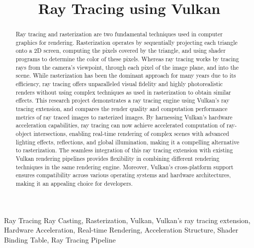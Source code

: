\documentclass[conference]{IEEEtran}
\begin{document}
\title{Ray Tracing using Vulkan}

\author{
}

\maketitle

\begin{abstract}
    Ray tracing and rasterization are two fundamental techniques used in computer graphics for rendering. Rasterization operates by sequentially projecting each triangle onto a 2D screen, computing the pixels covered by the triangle, and using shader programs to determine the color of these pixels. Whereas ray tracing works by tracing rays from the camera's viewpoint, through each pixel of the image plane, and into the scene. While rasterization has been the dominant approach for many years due to its efficiency, ray tracing offers unparalleled visual fidelity and highly photorealistic renders without using complex techniques as used in rasterization to obtain similar effects. This research project demonstrates a ray tracing engine using Vulkan's ray tracing extension, and compares the render quality and computation performance metrics of ray traced images to rasterized images. By harnessing Vulkan's hardware acceleration capabilities, ray tracing can now achieve accelerated computation of ray-object intersections, enabling real-time rendering of complex scenes with advanced lighting effects, reflections, and global illumination, making it a compelling alternative to rasterization. The seamless integration of this ray tracing extension with existing Vulkan rendering pipelines provides flexibility in combining different rendering techniques in the same rendering engine. Moreover, Vulkan's cross-platform support ensures compatibility across various operating systems and hardware architectures, making it an appealing choice for developers. 
\end{abstract}

\begin{IEEEkeywords}
Ray Tracing Ray Casting, Rasterization, Vulkan, Vulkan's ray tracing extension, Hardware Acceleration, Real-time Rendering, Acceleration Structure, Shader Binding Table, Ray Tracing Pipeline
\end{IEEEkeywords}
\end{document}

